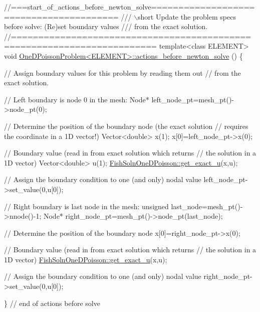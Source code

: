 \begin{DoxyCodeInclude}
\textcolor{comment}{//===start\_of\_actions\_before\_newton\_solve========================================}
\textcolor{comment}{/// \(\backslash\)short Update the problem specs before solve: (Re)set boundary values}
\textcolor{comment}{}\textcolor{comment}{/// from the exact solution. }
\textcolor{comment}{}\textcolor{comment}{//========================================================================}
\textcolor{keyword}{template}<\textcolor{keyword}{class} ELEMENT>
\textcolor{keywordtype}{void} \hyperlink{classOneDPoissonProblem_a6e42423869771fbd216326cba516a76b}{OneDPoissonProblem<ELEMENT>::actions\_before\_newton\_solve}
      ()
\{
 
 \textcolor{comment}{// Assign boundary values for this problem by reading them out}
 \textcolor{comment}{// from the exact solution.}

 \textcolor{comment}{// Left boundary is node 0 in the mesh:}
 Node* left\_node\_pt=mesh\_pt()->node\_pt(0);

 \textcolor{comment}{// Determine the position of the boundary node (the exact solution}
 \textcolor{comment}{// requires the coordinate in a 1D vector!)}
 Vector<double> x(1);
 x[0]=left\_node\_pt->x(0);
 
 \textcolor{comment}{// Boundary value (read in from exact solution which returns}
 \textcolor{comment}{// the solution in a 1D vector)}
 Vector<double> u(1);
 \hyperlink{namespaceFishSolnOneDPoisson_a52c9346f567cb68fe20268a592deb4bc}{FishSolnOneDPoisson::get\_exact\_u}(x,u);
 
 \textcolor{comment}{// Assign the boundary condition to one (and only) nodal value}
 left\_node\_pt->set\_value(0,u[0]);


 \textcolor{comment}{// Right boundary is last node in the mesh:}
 \textcolor{keywordtype}{unsigned} last\_node=mesh\_pt()->nnode()-1;
 Node* right\_node\_pt=mesh\_pt()->node\_pt(last\_node);

 \textcolor{comment}{// Determine the position of the boundary node}
 x[0]=right\_node\_pt->x(0);
 
 \textcolor{comment}{// Boundary value (read in from exact solution which returns}
 \textcolor{comment}{// the solution in a 1D vector)}
 \hyperlink{namespaceFishSolnOneDPoisson_a52c9346f567cb68fe20268a592deb4bc}{FishSolnOneDPoisson::get\_exact\_u}(x,u);
 
 \textcolor{comment}{// Assign the boundary condition to one (and only) nodal value}
 right\_node\_pt->set\_value(0,u[0]);

 
\} \textcolor{comment}{// end of actions before solve}

\end{DoxyCodeInclude}




